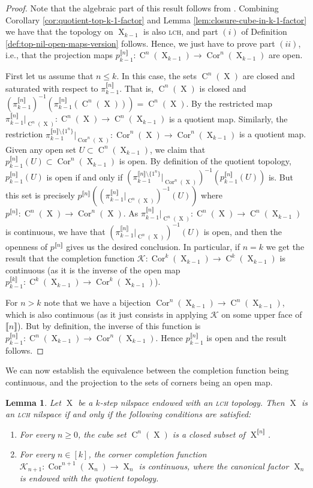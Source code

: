 \documentclass[a4paper,12pt,reqno]{amsart}
\newtheorem{lemma}[theorem]{Lemma}
\theoremstyle{definition}
\def\to{\rightarrow}
\newcommand*{\db}[1]{\llbracket #1\rrbracket}
\newcommand{\mc}{\mathcal}
\DeclareMathOperator{\ns}{X}
\DeclareMathOperator{\cu}{C}
\DeclareMathOperator{\cor}{Cor}
\begin{document}
\begin{proof}
Note that the algebraic part of this result follows from \cite[Lemma 3.2.10]{Cand:Notes1}. Combining Corollary \ref{cor:quotient-top-k-1-factor} and Lemma \ref{lem:closure-cube-in-k-1-factor} we have that the topology on $\ns_{k-1}$ is also \textsc{lch}, and part $(i)$ of Definition \ref{def:top-nil-open-maps-version} follows. Hence, we just have to prove part $(ii)$, i.e.,  that the projection maps $p_{k-1}^{\db{n}}:\cu^n(\ns_{k-1})\to \cor^{n}(\ns_{k-1})$ are open. 

First let us assume that $n\le k$. In this case, the sets $\cu^n(\ns)$ are closed and saturated with respect to $\pi_{k-1}^{\db{n}}$. That is, $\cu^n(\ns)$ is closed and $(\pi_{k-1}^{\db{n}})^{-1}(\pi_{k-1}^{\db{n}}(\cu^n(\ns)))=\cu^n(\ns)$. By \cite[Theorem 22.1]{Mu} the restricted map $\pi_{k-1}^{\db{n}}|_{\cu^n(\ns)}:\cu^n(\ns)\to \cu^n(\ns_{k-1})$ is a quotient map. Similarly, the restriction $\pi_{k-1}^{\db{n}\setminus\{1^n\}}|_{\cor^n(\ns)}:\cor^n(\ns)\to \cor^n(\ns_{k-1})$ is a quotient map. Given any open set $U\subset \cu^n(\ns_{k-1})$, we claim that $p_{k-1}^{\db{n}}(U)\subset \cor^n(\ns_{k-1})$ is open. By definition of the quotient topology, $p_{k-1}^{\db{n}}(U)$ is open if and only if $(\pi_{k-1}^{\db{n}\setminus\{1^n\}}|_{\cor^n(\ns)})^{-1}(p_{k-1}^{\db{n}}(U))$ is. But this set is precisely $p^{\db{n}}((\pi_{k-1}^{\db{n}}|_{\cu^n(\ns)})^{-1}(U))$ where $p^{\db{n}}:\cu^n(\ns)\to\cor^n(\ns)$. As $\pi_{k-1}^{\db{n}}|_{\cu^n(\ns)}:\cu^n(\ns)\to\cu^n(\ns_{k-1})$ is continuous, we have that $(\pi_{k-1}^{\db{n}}|_{\cu^n(\ns)})^{-1}(U)$ is open, and then the openness of $p^{\db{n}}$ gives us the desired conclusion.
In particular, if $n=k$ we get the result that the completion function $\mc{K}:\cor^k(\ns_{k-1})\to \cu^k(\ns_{k-1})$ is continuous (as it is the inverse of the open map $p_{k-1}^{\db{k}}:\cu^k(\ns_{k-1})\to \cor^k(\ns_{k-1})$). 

For $n>k$ note that we have a bijection $\cor^n(\ns_{k-1})\to \cu^n(\ns_{k-1})$, which is also continuous (as it just consists in applying $\mc{K}$ on some upper face of $\db{n}$). But by definition, the inverse of this function is $p_{k-1}^{\db{n}}:\cu^n(\ns_{k-1})\to \cor^n(\ns_{k-1})$. Hence $p_{k-1}^{\db{n}}$ is open and the result follows.
\end{proof}
\noindent We can now establish the equivalence between the completion function being continuous, and the projection to the sets of corners being an open map.
\begin{lemma}\label{lem:eq-def-lch-nil}
Let $\ns$ be a $k$-step nilspace endowed with an \textsc{lch} topology. Then $\ns$ is an \textsc{lch} nilspace if and only if the following conditions are satisfied:
\begin{enumerate}
    \item For every $n\ge 0$, the cube set $\cu^n(\ns)$ is a closed subset of $\ns^{\db{n}}$.
    \item For every $n\in[k]$, the corner completion function $\mc{K}_{n+1}:\cor^{n+1}(\ns_n)\to \ns_n$ is continuous, where the canonical factor $\ns_n$ is endowed with the quotient topology.
\end{enumerate}
\end{lemma}
\end{document}
